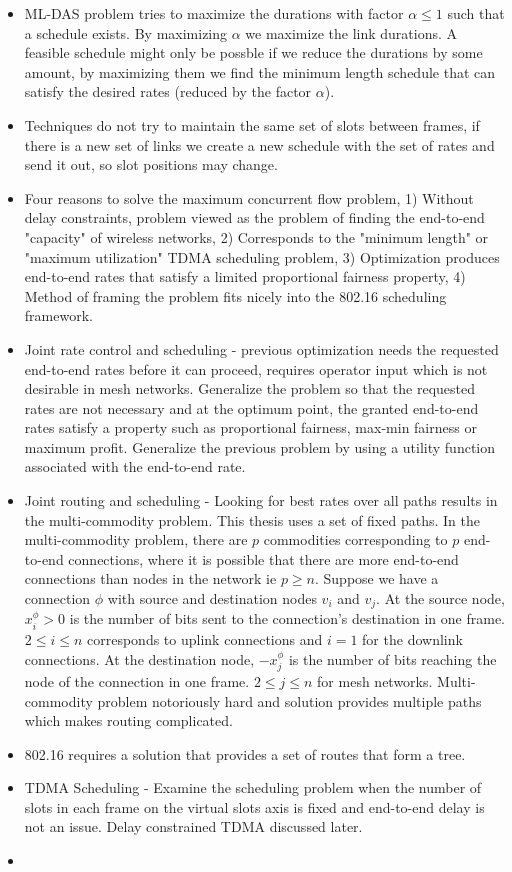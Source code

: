 \documentclass{article}
\begin{document}
\begin{itemize}
    \item ML-DAS problem tries to maximize the durations with factor $\alpha \leq 1$ such that a schedule exists.  By maximizing $\alpha$ we maximize the link durations.  A feasible schedule might only be possble if we reduce the durations by some amount, by maximizing them we find the minimum length schedule that can satisfy the desired rates (reduced by the factor $\alpha$).
    \item Techniques do not try to maintain the same set of slots between frames, if there is a new set of links we create a new schedule with the set of rates and send it out, so slot positions may change.
    \item Four reasons to solve the maximum concurrent flow problem, 1) Without delay constraints, problem viewed as the problem of finding the end-to-end "capacity" of wireless networks, 2) Corresponds to the "minimum length" or "maximum utilization" TDMA scheduling problem, 3) Optimization produces end-to-end rates that satisfy a limited proportional fairness property, 4) Method of framing the problem fits nicely into the 802.16 scheduling framework.
    \item Joint rate control and scheduling - previous optimization needs the requested end-to-end rates before it can proceed, requires operator input which is not desirable in mesh networks.  Generalize the problem so that the requested rates are not necessary and at the optimum point, the granted end-to-end rates satisfy a property such as proportional fairness, max-min fairness or maximum profit. Generalize the previous problem by using a utility function associated with the end-to-end rate.
    \item Joint routing and scheduling - Looking for best rates over all paths results in the multi-commodity problem.  This thesis uses a set of fixed paths.  In the multi-commodity problem, there are $p$ commodities corresponding to $p$ end-to-end connections, where it is possible that there are more end-to-end connections than nodes in the network ie $p \geq n$.  Suppose we have a connection $\phi$ with source and destination nodes $v_i$ and $v_j$.  At the source node, $x_i^\phi > 0$ is the number of bits sent to the connection's destination in one frame.  $2 \leq i \leq n$ corresponds to uplink connections and $i=1$ for the downlink connections.  At the destination node, $-x_j^\phi$ is the number of bits reaching the node of the connection in one frame.  $2 \leq j \leq n$ for mesh networks. Multi-commodity problem notoriously hard and solution provides multiple paths which makes routing complicated.  
    \item 802.16 requires a solution that provides a set of routes that form a tree.
    \item TDMA Scheduling - Examine the scheduling problem when the number of slots in each frame on the virtual slots axis is fixed and end-to-end delay is not an issue.  Delay constrained TDMA discussed later.
    \item 
\end{itemize}
\end{document}
